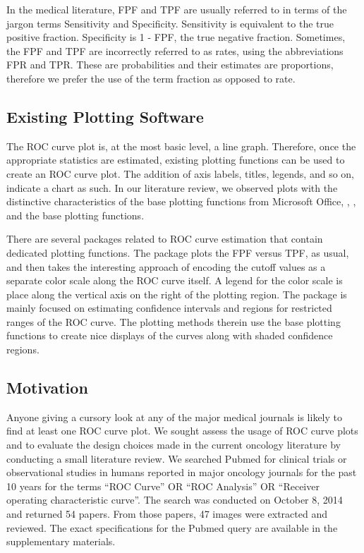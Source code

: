 \documentclass[article]{jss}
\begin{document}
In the medical literature, FPF and TPF are usually referred to in terms
of the jargon terms Sensitivity and Specificity. Sensitivity is
equivalent to the true positive fraction. Specificity is 1 - FPF, the
true negative fraction. Sometimes, the FPF and TPF are incorrectly
referred to as rates, using the abbreviations FPR and TPR. These are
probabilities and their estimates are proportions, therefore we prefer
the use of the term fraction as opposed to rate.

\subsection{Existing Plotting
Software}\label{existing-plotting-software}

The ROC curve plot is, at the most basic level, a line graph. Therefore,
once the appropriate statistics are estimated, existing plotting
functions can be used to create an ROC curve plot. The addition of axis
labels, titles, legends, and so on, indicate a chart as such. In our
literature review, we observed plots with the distinctive
characteristics of the base plotting functions from Microsoft Office,
, , and the base  plotting
functions.

There are several  packages related to ROC curve estimation
that contain dedicated plotting functions. The  package
\citep{rocr} plots the FPF versus TPF, as usual, and then takes the
interesting approach of encoding the cutoff values as a separate color
scale along the ROC curve itself. A legend for the color scale is place
along the vertical axis on the right of the plotting region. The
 package \citep{pROC} is mainly focused on estimating
confidence intervals and regions for restricted ranges of the ROC curve.
The plotting methods therein use the base  plotting
functions to create nice displays of the curves along with shaded
confidence regions.

\subsection{Motivation}\label{motivation}

Anyone giving a cursory look at any of the major medical journals is
likely to find at least one ROC curve plot. We sought assess the usage
of ROC curve plots and to evaluate the design choices made in the
current oncology literature by conducting a small literature review. We
searched Pubmed for clinical trials or observational studies in humans
reported in major oncology journals for the past 10 years for the terms
``ROC Curve'' OR ``ROC Analysis'' OR ``Receiver operating characteristic
curve''. The search was conducted on October 8, 2014 and returned 54
papers. From those papers, 47 images were extracted and reviewed. The
exact specifications for the Pubmed query are available in the
supplementary materials.
\end{document}
